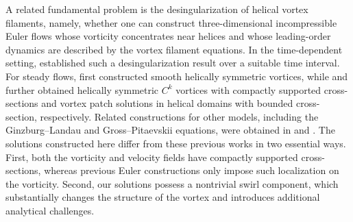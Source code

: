 \documentclass[12pt,reqno]{amsart}
\numberwithin{equation}{section}
\theoremstyle{definition}
\theoremstyle{remark}
\begin{document}
A related fundamental problem is the desingularization of helical vortex filaments, namely, whether one can construct three-dimensional incompressible Euler flows whose vorticity concentrates near helices and whose leading-order dynamics are described by the vortex filament equations. In the time-dependent setting, \cite{DonatiLacaveMiot} established such a desingularization result over a suitable time interval. For steady flows, \cite{DDMW2022} first constructed smooth helically symmetric vortices, while \cite{CaoWan2023} and \cite{CaoWan2024} further obtained helically symmetric $C^k$ vortices with compactly supported cross-sections and vortex patch solutions in helical domains with bounded cross-section, respectively. Related constructions for other models, including the Ginzburg–Landau and Gross–Pitaevskii equations, were obtained in \cite{DDMR1} and \cite{DDMR2}. The solutions constructed here differ from these previous works in two essential ways. First, both the vorticity and velocity fields have compactly supported cross-sections, whereas previous Euler constructions only impose such localization on the vorticity. Second, our solutions possess a nontrivial swirl component, which substantially changes the structure of the vortex and introduces additional analytical challenges.
 
\end{document}
